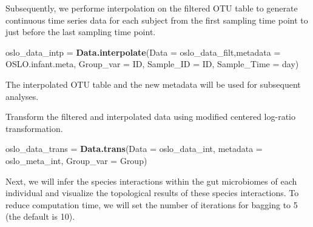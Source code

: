 \documentclass[
]{article}
\newenvironment{Shaded}{\begin{snugshade}}{\end{snugshade}}
\newcommand{\AttributeTok}[1]{\textcolor[rgb]{0.13,0.29,0.53}{#1}}
\newcommand{\FunctionTok}[1]{\textcolor[rgb]{0.13,0.29,0.53}{\textbf{#1}}}
\newcommand{\NormalTok}[1]{#1}
\newcommand{\OtherTok}[1]{\textcolor[rgb]{0.56,0.35,0.01}{#1}}
\newcommand{\SpecialCharTok}[1]{\textcolor[rgb]{0.81,0.36,0.00}{\textbf{#1}}}
\newcommand{\StringTok}[1]{\textcolor[rgb]{0.31,0.60,0.02}{#1}}
\begin{document}
Subsequently, we performe interpolation on the filtered OTU table to
generate continuous time series data for each subject from the first
sampling time point to just before the last sampling time point.

\begin{Shaded}
\begin{Highlighting}[]
\NormalTok{oslo\_data\_intp }\OtherTok{=} \FunctionTok{Data.interpolate}\NormalTok{(}\AttributeTok{Data =}\NormalTok{ oslo\_data\_filt,}\AttributeTok{metadata =}\NormalTok{ OSLO.infant.meta,}
                                  \AttributeTok{Group\_var =} \StringTok{\textquotesingle{}ID\textquotesingle{}}\NormalTok{,}
                                  \AttributeTok{Sample\_ID =} \StringTok{\textquotesingle{}ID\textquotesingle{}}\NormalTok{,}
                                  \AttributeTok{Sample\_Time =} \StringTok{\textquotesingle{}day\textquotesingle{}}\NormalTok{)}
\end{Highlighting}
\end{Shaded}

The interpolated OTU table and the new metadata will be used for
subsequent analyses.

\begin{Shaded}
\end{Shaded}

Transform the filtered and interpolated data using modified centered
log-ratio transformation.

\begin{Shaded}
\begin{Highlighting}[]
\NormalTok{oslo\_data\_trans }\OtherTok{=} \FunctionTok{Data.trans}\NormalTok{(}\AttributeTok{Data =}\NormalTok{ oslo\_data\_int,}
                             \AttributeTok{metadata =}\NormalTok{ oslo\_meta\_int,}
                             \AttributeTok{Group\_var =} \StringTok{\textquotesingle{}Group\textquotesingle{}}\NormalTok{)}
\end{Highlighting}
\end{Shaded}

Next, we will infer the species interactions within the gut microbiomes
of each individual and visualize the topological results of these
species interactions. To reduce computation time, we will set the number
of iterations for bagging to 5 (the default is 10).
\end{document}
